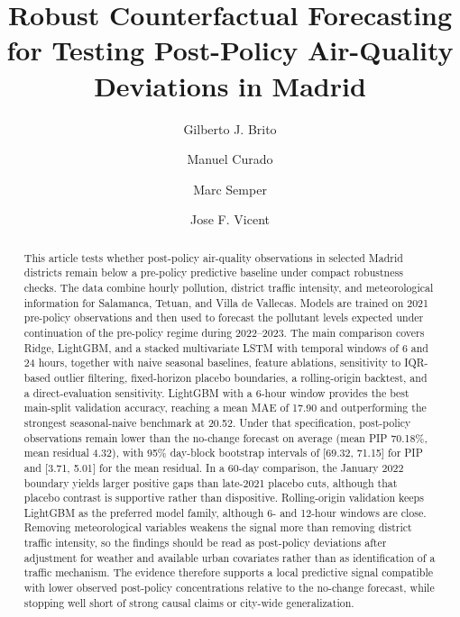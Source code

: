 \documentclass[runningheads]{llncs}
\begin{document}
\title{Robust Counterfactual Forecasting for Testing Post-Policy Air-Quality Deviations in Madrid}

\author{Gilberto J. Brito \and
Manuel Curado \and
Marc Semper \and
Jose F. Vicent}



\maketitle

\begin{abstract}
This article tests whether post-policy air-quality observations in selected Madrid districts remain below a pre-policy predictive baseline under compact robustness checks. The data combine hourly pollution, district traffic intensity, and meteorological information for Salamanca, Tetuan, and Villa de Vallecas. Models are trained on 2021 pre-policy observations and then used to forecast the pollutant levels expected under continuation of the pre-policy regime during 2022--2023. The main comparison covers Ridge, LightGBM, and a stacked multivariate LSTM with temporal windows of 6 and 24 hours, together with naive seasonal baselines, feature ablations, sensitivity to IQR-based outlier filtering, fixed-horizon placebo boundaries, a rolling-origin backtest, and a direct-evaluation sensitivity. LightGBM with a 6-hour window provides the best main-split validation accuracy, reaching a mean MAE of 17.90 and outperforming the strongest seasonal-naive benchmark at 20.52. Under that specification, post-policy observations remain lower than the no-change forecast on average (mean PIP 70.18\%, mean residual 4.32), with 95\% day-block bootstrap intervals of [69.32, 71.15] for PIP and [3.71, 5.01] for the mean residual. In a 60-day comparison, the January 2022 boundary yields larger positive gaps than late-2021 placebo cuts, although that placebo contrast is supportive rather than dispositive. Rolling-origin validation keeps LightGBM as the preferred model family, although 6- and 12-hour windows are close. Removing meteorological variables weakens the signal more than removing district traffic intensity, so the findings should be read as post-policy deviations after adjustment for weather and available urban covariates rather than as identification of a traffic mechanism. The evidence therefore supports a local predictive signal compatible with lower observed post-policy concentrations relative to the no-change forecast, while stopping well short of strong causal claims or city-wide generalization.

\end{abstract}












\end{document}
